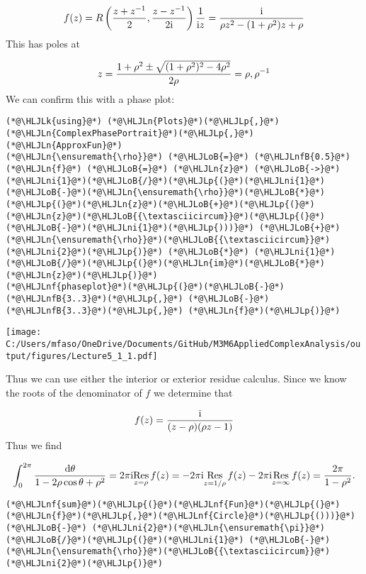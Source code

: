 \documentclass[12pt,a4paper]{article}
\newcommand{\HLJLk}[1]{\textcolor[RGB]{148,91,176}{\textbf{#1}}}
\newcommand{\HLJLn}[1]{#1}
\newcommand{\HLJLnf}[1]{\textcolor[RGB]{66,102,213}{#1}}
\newcommand{\HLJLnfB}[1]{\textcolor[RGB]{59,151,46}{#1}}
\newcommand{\HLJLni}[1]{\textcolor[RGB]{59,151,46}{#1}}
\newcommand{\HLJLoB}[1]{\textcolor[RGB]{102,102,102}{\textbf{#1}}}
\newcommand{\HLJLp}[1]{#1}
\def\D{ {\rm d} }
\def\I{ {\rm i} }
\def\Res_#1{\underset{#1}{\rm Res}\,}
\begin{document}
\[
f(z)= R\left({z + z^{-1} \over 2}, {z - z^{-1} \over 2 \I} \right) {1 \over \I z} =
{ \I \over \rho z^2 - (1+\rho^2) z + \rho}
\]
This has poles at

\[
z = {1 + \rho^2 \pm \sqrt{(1+\rho^2)^2 - 4 \rho^2 } \over 2\rho} = \rho, \rho^{-1}
\]
We can confirm this with a phase plot:


\begin{lstlisting}
(*@\HLJLk{using}@*) (*@\HLJLn{Plots}@*)(*@\HLJLp{,}@*) (*@\HLJLn{ComplexPhasePortrait}@*)(*@\HLJLp{,}@*) (*@\HLJLn{ApproxFun}@*)
(*@\HLJLn{\ensuremath{\rho}}@*) (*@\HLJLoB{=}@*) (*@\HLJLnfB{0.5}@*)
(*@\HLJLn{f}@*) (*@\HLJLoB{=}@*) (*@\HLJLn{z}@*) (*@\HLJLoB{->}@*)  (*@\HLJLni{1}@*)(*@\HLJLoB{/}@*)(*@\HLJLp{(}@*)(*@\HLJLni{1}@*)(*@\HLJLoB{-}@*)(*@\HLJLn{\ensuremath{\rho}}@*)(*@\HLJLoB{*}@*)(*@\HLJLp{(}@*)(*@\HLJLn{z}@*)(*@\HLJLoB{+}@*)(*@\HLJLp{(}@*)(*@\HLJLn{z}@*)(*@\HLJLoB{{\textasciicircum}}@*)(*@\HLJLp{(}@*)(*@\HLJLoB{-}@*)(*@\HLJLni{1}@*)(*@\HLJLp{)))}@*) (*@\HLJLoB{+}@*) (*@\HLJLn{\ensuremath{\rho}}@*)(*@\HLJLoB{{\textasciicircum}}@*)(*@\HLJLni{2}@*)(*@\HLJLp{)}@*) (*@\HLJLoB{*}@*) (*@\HLJLni{1}@*)(*@\HLJLoB{/}@*)(*@\HLJLp{(}@*)(*@\HLJLn{im}@*)(*@\HLJLoB{*}@*)(*@\HLJLn{z}@*)(*@\HLJLp{)}@*)
(*@\HLJLnf{phaseplot}@*)(*@\HLJLp{(}@*)(*@\HLJLoB{-}@*)(*@\HLJLnfB{3..3}@*)(*@\HLJLp{,}@*) (*@\HLJLoB{-}@*)(*@\HLJLnfB{3..3}@*)(*@\HLJLp{,}@*) (*@\HLJLn{f}@*)(*@\HLJLp{)}@*)
\end{lstlisting}

\texttt{[image: C:/Users/mfaso/OneDrive/Documents/GitHub/M3M6AppliedComplexAnalysis/output/figures/Lecture5\_1\_1.pdf]}

Thus we can use either the interior or exterior residue calculus.  Since we know the roots of the denominator of $f$ we determine that

\[
f(z) = {\I \over (z - \rho) (\rho z - 1)}
\]
Thus we find

\[
\int_0^{2\pi} {\D \theta \over 1 - 2\rho \cos \theta + \rho^2} = 2 \pi \I \Res_{z = \rho} f(z) =
-2 \pi \I \Res_{z = 1/\rho} f(z) -2 \pi \I \Res_{z = \infty} f(z) = {2 \pi \over 1 - \rho^2}.
\]

\begin{lstlisting}
(*@\HLJLnf{sum}@*)(*@\HLJLp{(}@*)(*@\HLJLnf{Fun}@*)(*@\HLJLp{(}@*)(*@\HLJLn{f}@*)(*@\HLJLp{,}@*)(*@\HLJLnf{Circle}@*)(*@\HLJLp{()))}@*) (*@\HLJLoB{-}@*) (*@\HLJLni{2}@*)(*@\HLJLn{\ensuremath{\pi}}@*)(*@\HLJLoB{/}@*)(*@\HLJLp{(}@*)(*@\HLJLni{1}@*) (*@\HLJLoB{-}@*) (*@\HLJLn{\ensuremath{\rho}}@*)(*@\HLJLoB{{\textasciicircum}}@*)(*@\HLJLni{2}@*)(*@\HLJLp{)}@*)
\end{lstlisting}
\end{document}

